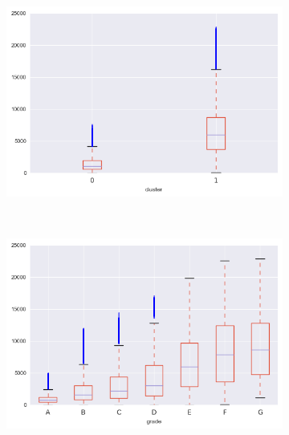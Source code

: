 \begin{anexosenv}
\begin{figure}[t!]
\begin{subfigure}[t]{0.5\textwidth}
            \centerline{\includegraphics[width=1.05\textwidth]{img/total_rec_int_by_cluster}}
        \end{subfigure}%
        ~ 
        \begin{subfigure}[t]{0.5\textwidth}
            \centering
   
            \centerline{\includegraphics[width=1.05\textwidth]{img/total_rec_int_by_grade}}

        \end{subfigure}
\end{figure}



\begin{figure}[t!]
    \centering
        \caption{total\textunderscore pymnt\textunderscore inv }
        \begin{subfigure}[t]{0.5\textwidth}
            \centering


\end{subfigure}
\end{figure}
\end{anexosenv}

